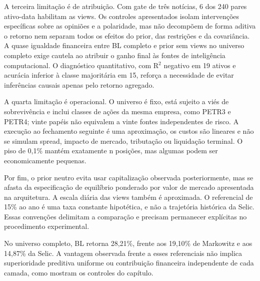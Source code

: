 A terceira limitação é de atribuição. Com gate de três notícias, 6 dos 240 pares ativo-data habilitam as views. Os controles apresentados isolam intervenções específicas sobre as opiniões e a polaridade, mas não decompõem de forma aditiva o retorno nem separam todos os efeitos do prior, das restrições e da covariância. A quase igualdade financeira entre BL completo e prior sem views no universo completo exige cautela ao atribuir o ganho final às fontes de inteligência computacional. O diagnóstico quantitativo, com R$^{2}$ negativo em 19 ativos e acurácia inferior à classe majoritária em 15, reforça a necessidade de evitar inferências causais apenas pelo retorno agregado.

A quarta limitação é operacional. O universo é fixo, está sujeito a viés de sobrevivência e inclui classes de ações da mesma empresa, como PETR3 e PETR4; vinte papéis não equivalem a vinte fontes independentes de risco. A execução ao fechamento seguinte é uma aproximação, os custos são lineares e não se simulam spread, impacto de mercado, tributação ou liquidação terminal. O piso de 0,1\% mantém exatamente n posições, mas algumas podem ser economicamente pequenas.

Por fim, o prior neutro evita usar capitalização observada posteriormente, mas se afasta da especificação de equilíbrio ponderado por valor de mercado apresentada na arquitetura. A escala diária das views também é aproximada. O referencial de 15\% ao ano é uma taxa constante hipotética, e não a trajetória histórica da Selic. Essas convenções delimitam a comparação e precisam permanecer explícitas no procedimento experimental.

No universo completo, BL retorna 28,21\%, frente aos 19,10\% de Markowitz e aos 14,87\% da Selic. A vantagem observada frente a esses referenciais não implica superioridade preditiva uniforme ou contribuição financeira independente de cada camada, como mostram os controles do capítulo.

